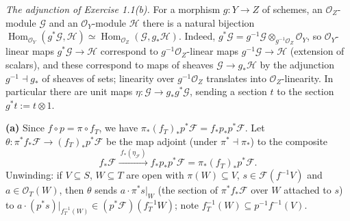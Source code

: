 \documentclass[11pt]{article}
\begin{document}
\pf
\emph{The adjunction of Exercise 1.1(b).} For a morphism $g:Y\to Z$ of schemes, an $\mathcal O_Z$-module $\mathcal G$ and an $\mathcal O_Y$-module $\mathcal H$ there is a natural bijection $\operatorname{Hom}_{\mathcal O_Y}(g^*\mathcal G,\mathcal H)\simeq\operatorname{Hom}_{\mathcal O_Z}(\mathcal G,g_*\mathcal H)$. Indeed, $g^*\mathcal G=g^{-1}\mathcal G\otimes_{g^{-1}\mathcal O_Z}\mathcal O_Y$, so $\mathcal O_Y$-linear maps $g^*\mathcal G\to\mathcal H$ correspond to $g^{-1}\mathcal O_Z$-linear maps $g^{-1}\mathcal G\to\mathcal H$ (extension of scalars), and these correspond to maps of sheaves $\mathcal G\to g_*\mathcal H$ by the adjunction $g^{-1}\dashv g_*$ of sheaves of sets; linearity over $g^{-1}\mathcal O_Z$ translates into $\mathcal O_Z$-linearity. In particular there are unit maps $\eta:\mathcal G\to g_*g^*\mathcal G$, sending a section $t$ to the section $g^*t:=t\otimes1$.

\textbf{(a)} Since $f\circ p=\pi\circ f_T$, we have $\pi_*(f_T)_*p^*\mathcal F=f_*p_*p^*\mathcal F$. Let $\theta:\pi^*f_*\mathcal F\to(f_T)_*p^*\mathcal F$ be the map adjoint (under $\pi^*\dashv\pi_*$) to the composite
\[ f_*\mathcal F\xrightarrow{\ f_*(\eta_{\mathcal F})\ }f_*p_*p^*\mathcal F=\pi_*(f_T)_*p^*\mathcal F. \]
Unwinding: if $V\subseteq S$, $W\subseteq T$ are open with $\pi(W)\subseteq V$, $s\in\mathcal F(f^{-1}V)$ and $a\in\mathcal O_T(W)$, then $\theta$ sends $a\cdot\pi^*s|_W$ (the section of $\pi^*f_*\mathcal F$ over $W$ attached to $s$) to $a\cdot(p^*s)|_{f_T^{-1}(W)}\in(p^*\mathcal F)(f_T^{-1}W)$; note $f_T^{-1}(W)\subseteq p^{-1}f^{-1}(V)$.
\end{document}
